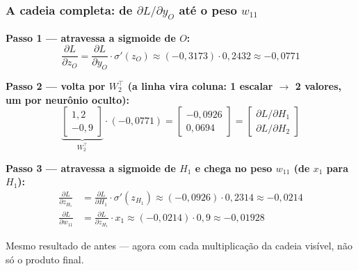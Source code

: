 \begin{frame}[shrink]
	\frametitle{A cadeia completa: de $\partial L/\partial y_O$ até o peso $w_{11}$}
	\small
	\setlength{\abovedisplayskip}{2pt}
	\setlength{\belowdisplayskip}{2pt}
	\par \textbf{Passo 1 --- atravessa a sigmoide de $O$:}
	\begin{equation*}
		\frac{\partial L}{\partial z_O} = \frac{\partial L}{\partial y_O} \cdot \sigma'(z_O) \approx (-0{,}3173)\cdot 0{,}2432 \approx -0{,}0771
	\end{equation*}
	\par \textbf{Passo 2 --- volta por $W_2^{\top}$ (a linha vira coluna: 1 escalar $\to$ 2 valores, um por neurônio oculto):}
	\begin{equation*}
		\underbrace{\begin{bmatrix} 1{,}2 \\ -0{,}9 \end{bmatrix}}_{W_2^{\top}} \cdot (-0{,}0771)
		=
		\begin{bmatrix} -0{,}0926 \\ 0{,}0694 \end{bmatrix}
		=
		\begin{bmatrix} \partial L/\partial H_1 \\ \partial L/\partial H_2 \end{bmatrix}
	\end{equation*}
	\par \textbf{Passo 3 --- atravessa a sigmoide de $H_1$ e chega no peso $w_{11}$ (de $x_1$ para $H_1$):}
	\begin{equation*}
		\begin{aligned}
			\frac{\partial L}{\partial z_{H_1}} & = \frac{\partial L}{\partial H_1}\cdot \sigma'(z_{H_1}) \approx (-0{,}0926)\cdot 0{,}2314 \approx -0{,}0214 \\
			\frac{\partial L}{\partial w_{11}} & = \frac{\partial L}{\partial z_{H_1}} \cdot x_1 \approx (-0{,}0214)\cdot 0{,}9 \approx -0{,}01928
		\end{aligned}
	\end{equation*}
	\par Mesmo resultado de antes --- agora com cada multiplicação da cadeia visível, não só o produto final.
\end{frame}
